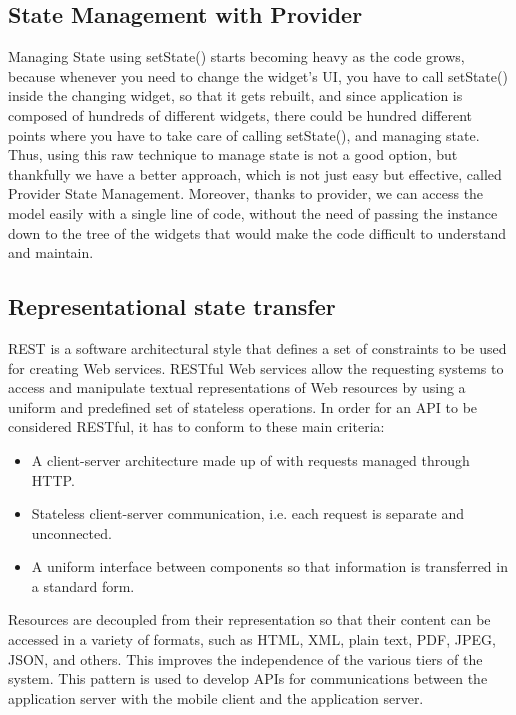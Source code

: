 \documentclass[../../dd.tex]{subfiles}
\begin{document}
    \subsection{State Management with Provider} Managing State using setState() starts becoming heavy as the code grows, because whenever you need to change the widget’s UI, you have to call setState() inside the changing widget, so that it gets rebuilt, and since application is composed of hundreds of different widgets, there could be hundred different points where you have to take care of calling setState(), and managing state. Thus, using this raw technique to manage state is not a good option, but thankfully we have a better approach, which is not just easy but effective, called Provider State Management. Moreover, thanks to provider, we can access the model easily with a single line of code, without the need of passing the instance down to the tree of the widgets that would make the code difficult to understand and maintain.


    \subsection{Representational state transfer} REST is a software architectural style that
    defines a set of constraints to be used for creating Web services. RESTful
    Web services allow the requesting systems to access and manipulate textual
    representations of Web resources by using a uniform and predefined set of
    stateless operations.
    In order for an API to be considered RESTful, it has to conform to these main criteria:
    \begin{itemize}
        \item A client-server architecture made up of with requests managed through HTTP.
        \item Stateless client-server communication, i.e. each request is separate and unconnected.
        \item A uniform interface between components so that information is transferred in a standard form.
    \end{itemize}
    Resources are decoupled from their representation so that their content can be accessed in a variety of formats, such as HTML, XML, plain text, PDF, JPEG, JSON, and others. This improves the independence of the various tiers of the system. This pattern is used to develop APIs for communications between the application server with the mobile client and the application server.
\end{document}
